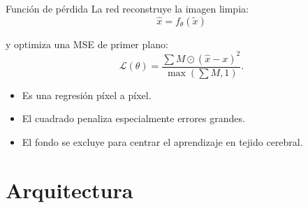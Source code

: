 \documentclass[10pt,aspectratio=169]{beamer}
\begin{document}
\begin{frame}{Función de pérdida}
  La red reconstruye la imagen limpia:
  \[
    \hat{x}=f_\theta(\widetilde{x})
  \]

  y optimiza una MSE de primer plano:
  \[
    \mathcal L(\theta)=
    \frac{\sum M\odot(\hat{x}-x)^2}{\max(\sum M,1)}.
  \]

  \begin{itemize}
    \item Es una regresión píxel a píxel.
    \item El cuadrado penaliza especialmente errores grandes.
    \item El fondo se excluye para centrar el aprendizaje en tejido cerebral.
  \end{itemize}
\end{frame}

\section{Arquitectura}
\end{document}
